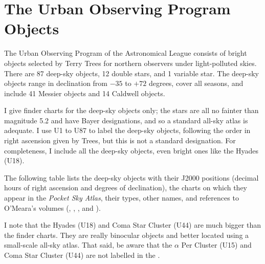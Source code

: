 
\chapter*{The Urban Observing Program\\Objects}

The Urban Observing Program of the Astronomical League consists of bright objects selected by Terry Trees for northern observers under light-polluted skies. There are 87 deep-sky objects, 12 double stars, and 1 variable star. The deep-sky objects range in declination from $-35$ to $+72$ degrees, cover all seasons, and include 41 Messier objects and 14 Caldwell objects.

I give finder charts for the deep-sky objects only; the stars are all no fainter than magnitude 5.2 and have Bayer designations, and so a standard all-sky atlas is adequate. I use U1 to U87 to label the deep-sky objects, following the order in right ascension given by Trees, but this is not a standard designation.  For completeness, I include all the deep-sky objects, even bright ones like the Hyades (U18).

The following table lists the deep-sky objects with their J2000 positions (decimal hours of right ascension and degrees of declination), the charts on which they appear in the \emph{Pocket Sky Atlas}, their types, other names, and references to O’Meara’s  volumes (, , , and ).

I note that the Hyades (U18) and Coma Star Cluster (U44) are much bigger than the finder charts. They are really binocular objects and better located using a small-scale all-sky atlas. That said, be aware that the $\alpha$ Per Cluster (U15) and Coma Star Cluster (U44) are not labelled in the {\PSA}.

\clearpage



\clearpage


\clearpage



